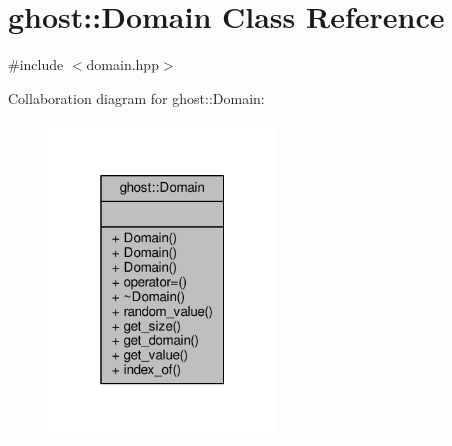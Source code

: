 \hypertarget{classghost_1_1Domain}{}\section{ghost\+:\+:Domain Class Reference}
\label{classghost_1_1Domain}


{\ttfamily \#include $<$domain.\+hpp$>$}



Collaboration diagram for ghost\+:\+:Domain\+:\nopagebreak
\begin{figure}[H]
\begin{center}
\leavevmode
\includegraphics[width=172pt]{classghost_1_1Domain__coll__graph}
\end{center}
\end{figure}
